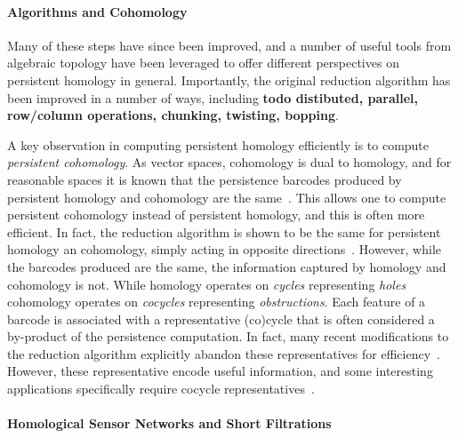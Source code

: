 \paragraph{Algorithms and Cohomology}

Many of these steps have since been improved, and a number of useful tools from algebraic topology have been leveraged to offer different perspectives on persistent homology in general.
Importantly, the original reduction algorithm has been improved in a number of ways, including \textbf{todo distibuted, parallel, row/column operations, chunking, twisting, bopping}.

A key observation in computing persistent homology efficiently is to compute \emph{persistent cohomology}.
As vector spaces, cohomology is dual to homology, and for reasonable spaces it is known that the persistence barcodes produced by persistent homology and cohomology are the same~\cite{todo}.
This allows one to compute persistent cohomology instead of persistent homology, and this is often more efficient.
In fact, the reduction algorithm is shown to be the same for persistent homology an cohomology, simply acting in opposite directions~\cite{desilva11duality}.
However, while the barcodes produced are the same, the information captured by homology and cohomology is not.
While homology operates on \emph{cycles} representing \emph{holes} cohomology operates on \emph{cocycles} representing \emph{obstructions}.
Each feature of a barcode is associated with a representative (co)cycle that is often considered a by-product of the persistence computation.
In fact, many recent modifications to the reduction algorithm explicitly abandon these representatives for efficiency~\cite{todo}.
However, these representative encode useful information, and some interesting applications specifically require cocycle representatives~\cite{desilva11circular}.

\paragraph{Homological Sensor Networks and Short Filtrations}

